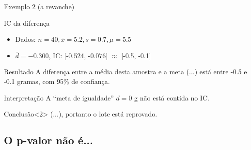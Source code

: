 \documentclass{beamer}
\begin{document}
\begin{frame}{\scriptsize Exemplo 2 (a revanche)}
  \begin{exampleblock}{IC da diferença}
    \footnotesize
    \begin{itemize}
      \scriptsize
    \item Dados: $n=40, \bar{x} = 5.2, s = 0.7, \mu = 5.5$
    \item $\bar{d} = -0.300$, IC: [-0.524, -0.076] $\approx$ [-0.5, -0.1]
    \end{itemize}
  \end{exampleblock}
  \begin{exampleblock}{Resultado}
    \footnotesize
    A diferença entre a média desta amostra e a meta (...)
    está entre -0.5 e -0.1 gramas, com 95\% de confiança.
  \end{exampleblock}
  \begin{exampleblock}{Interpretação}
    \footnotesize
    A ``meta de igualdade'' $d = 0$ g não está contida no IC.
  \end{exampleblock}
  \begin{exampleblock}{Conclusão}<2>
    \footnotesize
    (...), portanto o lote está reprovado.
  \end{exampleblock}
\end{frame}

\subsection{O p-valor não é...}
\end{document}

